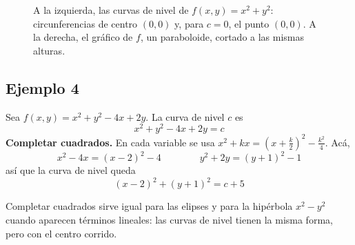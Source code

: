 \documentclass{article}
\begin{document}
\begin{figure}[H]
    \caption{A la izquierda, las curvas de nivel de \(f(x,y)=x^2+y^2\): circunferencias de centro \((0,0)\) y, para \(c=0\), el punto \((0,0)\). A la derecha, el gráfico de \(f\), un paraboloide, cortado a las mismas alturas.}
\end{figure}

\subsection*{Ejemplo 4}

Sea \(f(x,y)=x^2+y^2-4x+2y\). La curva de nivel \(c\) es
\[
x^2+y^2-4x+2y=c
\]
\textbf{Completar cuadrados.} En cada variable se usa {\color{teal}\(x^2+kx=\left(x+\frac{k}{2}\right)^2-\frac{k^2}{4}\)}. Acá,
\[
x^2-4x=(x-2)^2-4\qquad\qquad y^2+2y=(y+1)^2-1
\]
así que la curva de nivel queda
\[
(x-2)^2+(y+1)^2=c+5
\]


Completar cuadrados sirve igual para las elipses y para la hipérbola \(x^2-y^2\) cuando aparecen términos lineales: las curvas de nivel tienen la misma forma, pero con el centro corrido.
\end{document}

